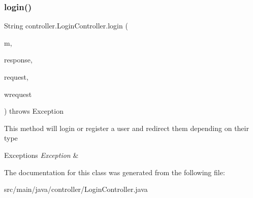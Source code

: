 \subsubsection{\texorpdfstring{login()}{login()}}
{\footnotesize\ttfamily String controller.\+Login\+Controller.\+login (\begin{DoxyParamCaption}\item[{Model}]{m,  }\item[{Http\+Servlet\+Response}]{response,  }\item[{Http\+Servlet\+Request}]{request,  }\item[{Web\+Request}]{wrequest }\end{DoxyParamCaption}) throws Exception\hspace{0.3cm}{\ttfamily [inline]}}

This method will login or register a user and redirect them depending on their type 
\begin{DoxyExceptions}{Exceptions}
{\em Exception} & \\
\hline
\end{DoxyExceptions}


The documentation for this class was generated from the following file\+:\begin{DoxyCompactItemize}
\item 
src/main/java/controller/Login\+Controller.\+java\end{DoxyCompactItemize}

